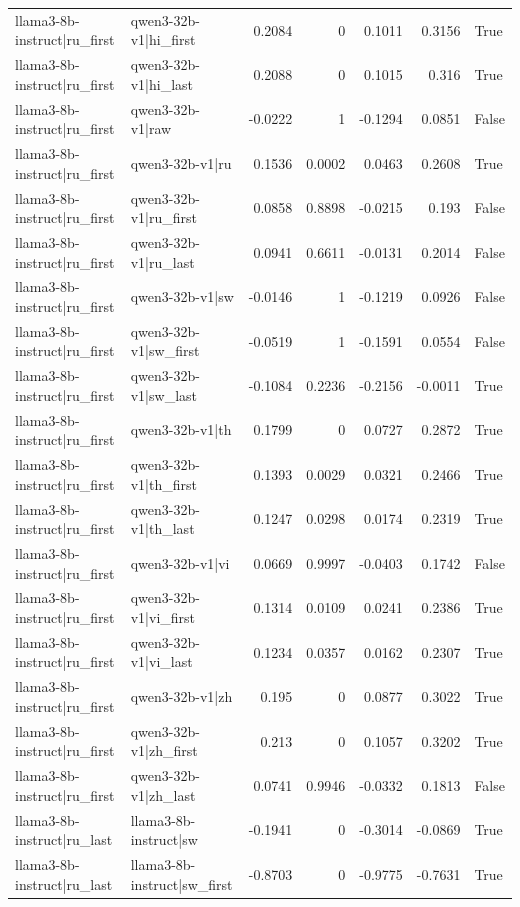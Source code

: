 \begin{table}
\begin{tabular}{l l r r r r l}
llama3-8b-instruct|ru_first & qwen3-32b-v1|hi_first & 0.2084 & 0 & 0.1011 & 0.3156 & True \\
llama3-8b-instruct|ru_first & qwen3-32b-v1|hi_last & 0.2088 & 0 & 0.1015 & 0.316 & True \\
llama3-8b-instruct|ru_first & qwen3-32b-v1|raw & -0.0222 & 1 & -0.1294 & 0.0851 & False \\
llama3-8b-instruct|ru_first & qwen3-32b-v1|ru & 0.1536 & 0.0002 & 0.0463 & 0.2608 & True \\
llama3-8b-instruct|ru_first & qwen3-32b-v1|ru_first & 0.0858 & 0.8898 & -0.0215 & 0.193 & False \\
llama3-8b-instruct|ru_first & qwen3-32b-v1|ru_last & 0.0941 & 0.6611 & -0.0131 & 0.2014 & False \\
llama3-8b-instruct|ru_first & qwen3-32b-v1|sw & -0.0146 & 1 & -0.1219 & 0.0926 & False \\
llama3-8b-instruct|ru_first & qwen3-32b-v1|sw_first & -0.0519 & 1 & -0.1591 & 0.0554 & False \\
llama3-8b-instruct|ru_first & qwen3-32b-v1|sw_last & -0.1084 & 0.2236 & -0.2156 & -0.0011 & True \\
llama3-8b-instruct|ru_first & qwen3-32b-v1|th & 0.1799 & 0 & 0.0727 & 0.2872 & True \\
llama3-8b-instruct|ru_first & qwen3-32b-v1|th_first & 0.1393 & 0.0029 & 0.0321 & 0.2466 & True \\
llama3-8b-instruct|ru_first & qwen3-32b-v1|th_last & 0.1247 & 0.0298 & 0.0174 & 0.2319 & True \\
llama3-8b-instruct|ru_first & qwen3-32b-v1|vi & 0.0669 & 0.9997 & -0.0403 & 0.1742 & False \\
llama3-8b-instruct|ru_first & qwen3-32b-v1|vi_first & 0.1314 & 0.0109 & 0.0241 & 0.2386 & True \\
llama3-8b-instruct|ru_first & qwen3-32b-v1|vi_last & 0.1234 & 0.0357 & 0.0162 & 0.2307 & True \\
llama3-8b-instruct|ru_first & qwen3-32b-v1|zh & 0.195 & 0 & 0.0877 & 0.3022 & True \\
llama3-8b-instruct|ru_first & qwen3-32b-v1|zh_first & 0.213 & 0 & 0.1057 & 0.3202 & True \\
llama3-8b-instruct|ru_first & qwen3-32b-v1|zh_last & 0.0741 & 0.9946 & -0.0332 & 0.1813 & False \\
llama3-8b-instruct|ru_last & llama3-8b-instruct|sw & -0.1941 & 0 & -0.3014 & -0.0869 & True \\
llama3-8b-instruct|ru_last & llama3-8b-instruct|sw_first & -0.8703 & 0 & -0.9775 & -0.7631 & True \\

\end{tabular}
\end{table}
